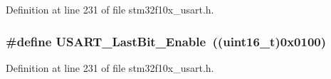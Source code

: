 Definition at line 231 of file stm32f10x\+\_\+usart.\+h.

\subsubsection[{\texorpdfstring{U\+S\+A\+R\+T\+\_\+\+Last\+Bit\+\_\+\+Enable}{USART_LastBit_Enable}}]{\setlength{\rightskip}{0pt plus 5cm}\#define U\+S\+A\+R\+T\+\_\+\+Last\+Bit\+\_\+\+Enable~(({\bf uint16\+\_\+t})0x0100)}\hypertarget{group___u_s_a_r_t___last___bit_gaf8c19d1ce01c6efff8c24ee82cc7b52e}{}\label{group___u_s_a_r_t___last___bit_gaf8c19d1ce01c6efff8c24ee82cc7b52e}


Definition at line 231 of file stm32f10x\+\_\+usart.\+h.

